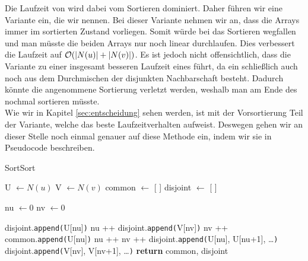 Die Laufzeit von \SorSor{} wird dabei vom Sortieren dominiert. Daher führen wir eine Variante ein, 
die wir  nennen. Bei dieser Variante nehmen wir an, dass
die Arrays immer im sortierten Zustand vorliegen. Somit würde bei \SorSor{} das Sortieren wegfallen
und man müsste die beiden Arrays nur noch linear durchlaufen. 
Dies verbessert die Laufzeit auf $\mathcal{O}(|N(u)| + |N(v)|)$. 
Es ist jedoch nicht offensichtlich, dass die Variante zu einer insgesamt besseren Laufzeit eines
 führt, da ein \ct{} schließlich auch noch aus dem Durchmischen der disjunkten Nachbarschaft besteht.
Dadurch könnte die angenommene Sortierung verletzt werden, weshalb man am Ende des  nochmal sortieren
müsste.
\\

Wie wir in Kapitel \ref{sec:entscheidung} sehen werden, 
ist \SorSor{} mit der Vorsortierung Teil der Variante, welche das beste Laufzeitverhalten aufweist.
Deswegen gehen wir an dieser Stelle 
noch einmal genauer auf diese Methode ein, indem wir sie in Pseudocode
beschreiben.
\begin{algorithm}
  \caption{SortSort}\label{algo:sortsort}
  \begin{algorithmic}[1]
	  \State U $ \gets N(u)$ 
	  \State V $ \gets N(v)$ 
	  \State common $\gets $  [ ] 
	  \State disjoint $\gets $ [ ]

	  \State nu $\gets 0$ 
	  \State nv $\gets 0$ 
      
			\State disjoint.\texttt{append(}U[nu]\texttt{)} 
			\State nu ++
				\State disjoint.\texttt{append(}V[nv]\texttt{)} 
				\State nv ++
				\State common.\texttt{append(}U[nu]\texttt{)} 
				\State nu ++
				\State nv ++
        \EndIf
      \EndWhile
       
			\State disjoint.\texttt{append(}U[nu], U[nu+1], \dots\texttt{)}
			\Else{}
			\State disjoint.\texttt{append(}V[nv], V[nv+1], \dots\texttt{)}
      \EndIf
      \State \textbf{return} common, disjoint
   \EndProcedure
  \end{algorithmic}
  \label{algo:sortsort}
\end{algorithm}
\\

